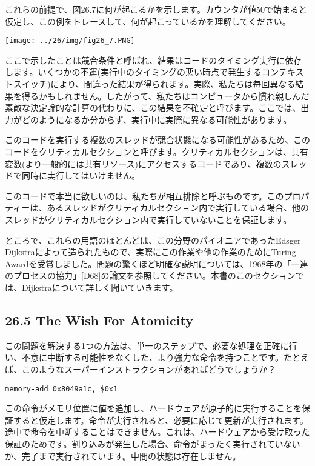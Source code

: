 これらの前提で、図26.7に何が起こるかを示します。カウンタが値50で始まると仮定し、この例をトレースして、何が起こっているかを理解してください。

\texttt{[image: ../26/img/fig26\_7.PNG]}

ここで示したことは競合条件と呼ばれ、結果はコードのタイミング実行に依存します。いくつかの不運(実行中のタイミングの悪い時点で発生するコンテキストスイッチ)により、間違った結果が得られます。実際、私たちは毎回異なる結果を得るかもしれません。したがって、私たちはコンピュータから慣れ親しんだ素敵な決定論的な計算の代わりに、この結果を不確定と呼びます。ここでは、出力がどのようになるか分からず、実行中に実際に異なる可能性があります。

このコードを実行する複数のスレッドが競合状態になる可能性があるため、このコードをクリティカルセクションと呼びます。クリティカルセクションは、共有変数(より一般的には共有リソース)にアクセスするコードであり、複数のスレッドで同時に実行してはいけません。

このコードで本当に欲しいのは、私たちが相互排除と呼ぶものです。このプロパティーは、あるスレッドがクリティカルセクション内で実行している場合、他のスレッドがクリティカルセクション内で実行していないことを保証します。

ところで、これらの用語のほとんどは、この分野のパイオニアであったEdsger
Dijkstraによって造られたもので、実際にこの作業や他の作業のためにTuring
Awardを受賞しました。問題の驚くほど明確な説明については、1968年の「一連のプロセスの協力」{[}D68{]}の論文を参照してください。本書のこのセクションでは、Dijkstraについて詳しく聞いていきます。

\hypertarget{the-wish-for-atomicity}{%
\subsection*{26.5 The Wish For Atomicity}\label{the-wish-for-atomicity}}

この問題を解決する1つの方法は、単一のステップで、必要な処理を正確に行い、不意に中断する可能性をなくした、より強力な命令を持つことです。たとえば、このようなスーパーインストラクションがあればどうでしょうか？

\begin{verbatim}
memory-add 0x8049a1c, $0x1
\end{verbatim}

この命令がメモリ位置に値を追加し、ハードウェアが原子的に実行することを保証すると仮定します。命令が実行されると、必要に応じて更新が実行されます。途中で命令を中断することはできません。これは、ハードウェアから受け取った保証のためです。割り込みが発生した場合、命令がまったく実行されていないか、完了まで実行されています。中間の状態は存在しません。

